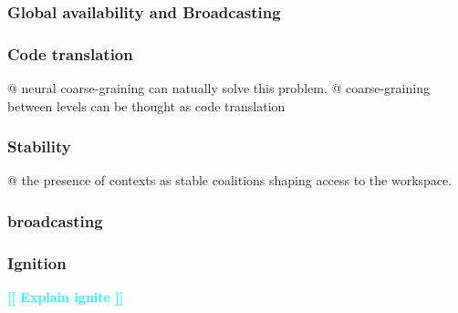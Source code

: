 \documentclass[utf8]{article}
\newenvironment{ants}
			{
			 \begin{easylist}[itemize]
			}
			{
			\end{easylist}
			}
\newcommand{\toWrite}[1]{\noindent
			\textcolor{Cyan}{\textbf{[[ #1 ]]}\newline}}
\begin{document}
			\subsubsection{Global availability and Broadcasting}
			
			\subsubsection{Code translation}
				\begin{ants}
					@ neural coarse-graining can natually solve this problem. 
					@ coarse-graining between levels can be thought as code translation
				\end{ants}
			
			
			\subsubsection{Stability}
				\begin{ants}
					@ the presence of contexts as stable coalitions shaping access to the workspace.
					
				\end{ants}
			
			
			\subsubsection{broadcasting}
			
			\subsubsection{Ignition}
				\toWrite{Explain ignite}
\end{document}
